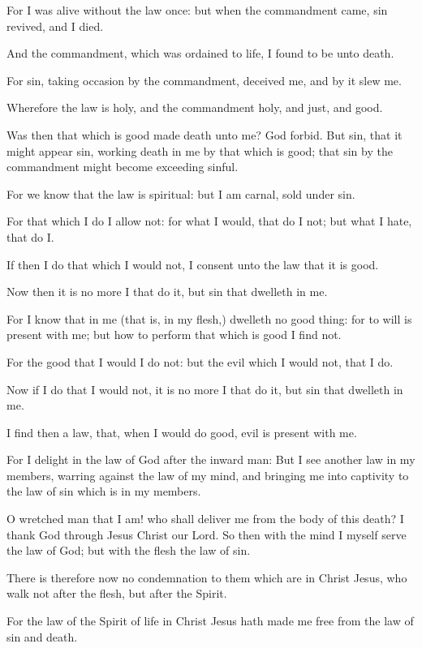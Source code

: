 \Verse For I was alive without the law once: but when the commandment came, sin revived, and I died.

\Verse And the commandment, which was ordained to life, I found to be unto death.

\Verse For sin, taking occasion by the commandment, deceived me, and by it slew me.

\Verse Wherefore the law is holy, and the commandment holy, and just, and good.

\Verse Was then that which is good made death unto me? God forbid. But sin, that it might appear sin, working death in me by that which is good; that sin by the commandment might become exceeding sinful.

\Verse For we know that the law is spiritual: but I am carnal, sold under sin.

\Verse For that which I do I allow not: for what I would, that do I not; but what I hate, that do I.

\Verse If then I do that which I would not, I consent unto the law that it is good.

\Verse Now then it is no more I that do it, but sin that dwelleth in me.

\Verse For I know that in me (that is, in my flesh,) dwelleth no good thing: for to will is present with me; but how to perform that which is good I find not.

\Verse For the good that I would I do not: but the evil which I would not, that I do.

\Verse Now if I do that I would not, it is no more I that do it, but sin that dwelleth in me.

\Verse I find then a law, that, when I would do good, evil is present with me.

\Verse For I delight in the law of God after the inward man: \Verse But I see another law in my members, warring against the law of my mind, and bringing me into captivity to the law of sin which is in my members.

\Verse O wretched man that I am! who shall deliver me from the body of this death?  \Verse I thank God through Jesus Christ our Lord. So then with the mind I myself serve the law of God; but with the flesh the law of sin.


\Chapter
\Verse There is therefore now no condemnation to them which are in Christ Jesus, who walk not after the flesh, but after the Spirit.

\Verse For the law of the Spirit of life in Christ Jesus hath made me free from the law of sin and death.

